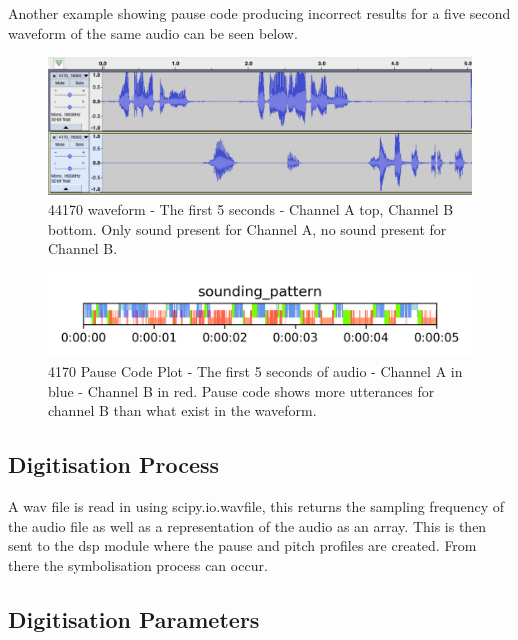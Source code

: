 Another example showing pause code producing incorrect results for a five second waveform of the same audio can be seen below. 

\begin{figure}[h!]
	\centerline{\includegraphics[scale=0.3]{src/main-matter/methodology/preliminary-testing/4170/waveform_4170_5s_chA_top_original}}
	\caption{44170 waveform - The first 5 seconds - Channel A top, Channel B bottom. Only sound present for Channel A, no sound present for Channel B.}
	\label{fig:upclose_sounding}
\end{figure}
\begin{figure}[h!]
	\centerline{\includegraphics[scale=0.9]{src/main-matter/methodology/preliminary-testing/4170/sounding_pattern_plot_4170_mono_5s_range_short}}
	\caption{4170 Pause Code Plot - The first 5 seconds of audio - Channel A in blue - Channel B in red. Pause code shows more utterances for channel B than what exist in the waveform.}
	\label{fig:upclose_sounding}
\end{figure}



\subsection{Digitisation Process}
A wav file is read in using scipy.io.wavfile, this returns the sampling frequency of the audio file as well as a representation of the audio as an array. This is then sent to the dsp module where the pause and pitch profiles are created. From there the symbolisation process can occur.

\subsection{Digitisation Parameters}
